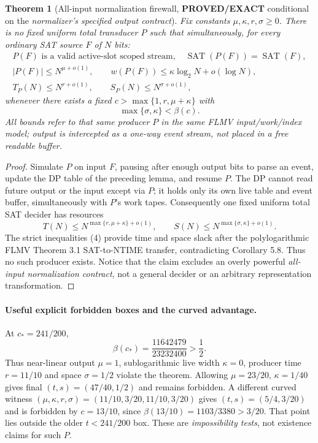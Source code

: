 \documentclass[11pt]{article}
\newtheorem{theorem}{Theorem}
\newcommand{\EXACT}{\textbf{PROVED/EXACT}}
\begin{document}
\begin{theorem}[All-input normalization firewall, \EXACT{} conditional on the \emph{normalizer's specified output contract}]
Fix constants $\mu,\kappa,r,\sigma\ge0$. There is \emph{no} fixed uniform total transducer $P$ such that simultaneously, for every ordinary SAT source $F$ of $N$ bits:
\[
\begin{gathered}
P(F)\text{ is a valid active-slot scoped stream},\quad
 \operatorname{SAT}(P(F))=\operatorname{SAT}(F),\\
|P(F)|\le N^{\mu+o(1)},\qquad
w(P(F))\le\kappa\log_2N+o(\log N),\\
T_P(N)\le N^{r+o(1)},\qquad S_P(N)\le N^{\sigma+o(1)},
\end{gathered}\tag{3}
\]
whenever there exists a fixed $c>\max\{1,r,\mu+\kappa\}$ with
\[
 \max\{\sigma,\kappa\}<\beta(c).
 \tag{4}
\]
All bounds refer to that same producer $P$ in the same FLMV input/work/index model; output is intercepted as a \emph{one-way} event stream, not placed in a free readable buffer.
\end{theorem}
\begin{proof}
Simulate $P$ on input $F$, pausing after enough output bits to parse an event, update the DP table of the preceding lemma, and resume $P$. The DP cannot read future output or the input except via $P$; it holds only its own live table and event buffer, simultaneously with $P$'s work tapes. Consequently one fixed uniform total SAT decider has resources
\[
 T(N)\le N^{\max\{r,\mu+\kappa\}+o(1)},\qquad
 S(N)\le N^{\max\{\sigma,\kappa\}+o(1)}.
 \tag{5}
\]
The strict inequalities (4) provide time and space slack after the polylogarithmic FLMV Theorem 3.1 SAT-to-NTIME transfer, contradicting Corollary 5.8. Thus no such producer exists. Notice that the claim excludes an overly powerful \emph{all-input normalization contract}, not a general decider or an arbitrary representation transformation.
\end{proof}

\paragraph{Useful explicit forbidden boxes and the curved advantage.}
At $c_*=241/200$,
\[
\beta(c_*)=\frac{11642479}{23232400}>\frac12.
\]
Thus near-linear output $\mu=1$, sublogarithmic live width $\kappa=0$, producer time $r=11/10$ and space $\sigma=1/2$ violate the theorem. Allowing $\mu=23/20$, $\kappa=1/40$ gives final $(t,s)=(47/40,1/2)$ and remains forbidden. A different curved witness $(\mu,\kappa,r,\sigma)=(11/10,3/20,11/10,3/20)$ gives $(t,s)=(5/4,3/20)$ and is forbidden by $c=13/10$, since $\beta(13/10)=1103/3380>3/20$. That point lies outside the older $t<241/200$ box. These are \emph{impossibility tests}, not existence claims for such $P$.
\end{document}
